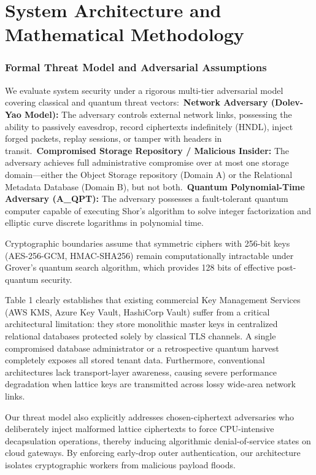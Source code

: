 \documentclass[5p,times]{elsarticle}
\begin{document}
\section{System Architecture and Mathematical Methodology}


\subsubsection{Formal Threat Model and Adversarial Assumptions}

We evaluate system security under a rigorous multi-tier adversarial model covering classical and quantum threat vectors:\newline \textbullet\  \textbf{Network Adversary (Dolev-Yao Model):} The adversary controls external network links, possessing the ability to passively eavesdrop, record ciphertexts indefinitely (HNDL), inject forged packets, replay sessions, or tamper with headers in transit.\newline \textbullet\  \textbf{Compromised Storage Repository / Malicious Insider:} The adversary achieves full administrative compromise over at most one storage domain---either the Object Storage repository (Domain A) or the Relational Metadata Database (Domain B), but not both.\newline \textbullet\  \textbf{Quantum Polynomial-Time Adversary (A\_QPT):} The adversary possesses a fault-tolerant quantum computer capable of executing Shor's algorithm to solve integer factorization and elliptic curve discrete logarithms in polynomial time.

Cryptographic boundaries assume that symmetric ciphers with 256-bit keys (AES-256-GCM, HMAC-SHA256) remain computationally intractable under Grover's quantum search algorithm, which provides 128 bits of effective post-quantum security.

Table 1 clearly establishes that existing commercial Key Management Services (AWS KMS, Azure Key Vault, HashiCorp Vault) suffer from a critical architectural limitation: they store monolithic master keys in centralized relational databases protected solely by classical TLS channels. A single compromised database administrator or a retrospective quantum harvest completely exposes all stored tenant data. Furthermore, conventional architectures lack transport-layer awareness, causing severe performance degradation when lattice keys are transmitted across lossy wide-area network links.

Our threat model also explicitly addresses chosen-ciphertext adversaries who deliberately inject malformed lattice ciphertexts to force CPU-intensive decapsulation operations, thereby inducing algorithmic denial-of-service states on cloud gateways. By enforcing early-drop outer authentication, our architecture isolates cryptographic workers from malicious payload floods.
\end{document}
